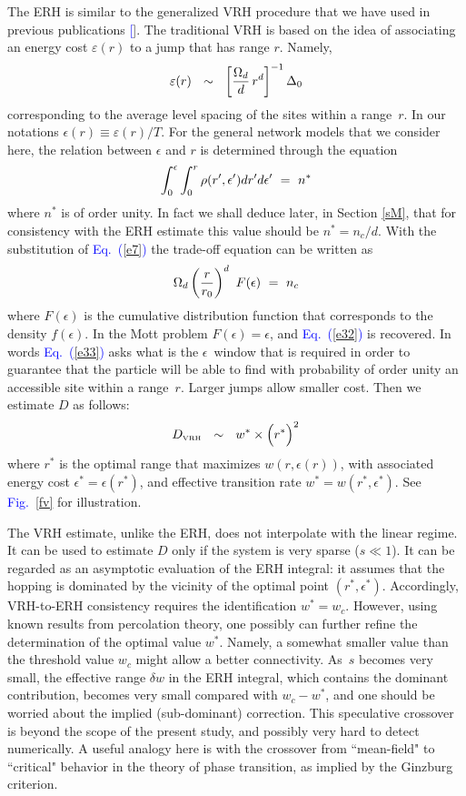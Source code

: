 \documentclass[aps,pre,floats,floatfix,twocolumn]{revtex4}
\newcommand{\tbox}[1]{\mbox{\tiny #1}}
\newcommand{\mylabel}[1]{\label{#1}}
\newcommand{\eeq}{\end{eqnarray}}
\newcommand{\be}[1]{\begin{eqnarray}\ifthenelse{#1=-1}
{\nonumber}{\ifthenelse{#1=0}{}{\mylabel{e#1}}}}
\newcommand{\Eq}[1]{\textcolor{blue}{Eq.\!\!~(\ref{#1})}}
\newcommand{\Fig}[1]{\textcolor{blue}{Fig.}\!\!~\ref{#1}}
\newcommand{\rmrk}[1]{#1}
\renewcommand{\cite}[1]{\textcolor{blue}{[\onlinecite{#1}}]} %
\begin{document}
The ERH is similar to the generalized VRH procedure 
that we have used in previous publications \cite{kbd,kbw}.
The traditional VRH is based on the idea of associating
an energy cost $\varepsilon(r)$ to a jump that has range $r$. Namely,  
%
\be{32}
\varepsilon(r) \ \ \sim \ \ \left[\frac{\Omega_d}{d}\, r^d\right]^{-1} \Delta_0
\eeq
%  
corresponding to the average level spacing 
of the sites within a range~$r$. 
%
In our notations $\epsilon(r) \equiv \varepsilon(r)/T$.  
For the general network models that we consider here,
the relation between $\epsilon$ and $r$ 
is determined through the equation 
%
\be{33}
\int_0^{\epsilon} \int_0^{r} \rho(r',\epsilon')  dr'd\epsilon' \  = \  n^* 
\eeq
%
where $n^*$ is of order unity. In fact we shall deduce later, 
in Section \ref{sM}, that for consistency with the ERH estimate 
this value should be $n^*=n_c/d$. With the substitution 
of \Eq{e7} the trade-off equation can be written as 
%
\be{34}
\Omega_d\left(\frac{r}{r_0}\right)^d \ F(\epsilon) \ = \ n_c
\eeq
%
where $F(\epsilon)$ is the cumulative distribution function 
that corresponds to the density $f(\epsilon)$.
In the Mott problem $F(\epsilon)=\epsilon$, and \Eq{e32} is recovered.
In words \Eq{e33} asks what is the $\epsilon$~window that 
is required in order to guarantee that the particle will be able 
to find with probability of order unity an accessible site within 
a range~$r$. Larger jumps allow smaller cost. 
Then we estimate $D$ as follows: 
%
\be{35}
D_{\tbox{VRH}}  \ \ \sim \ \ 
w^* \times \Big(r^*\Big)^2
\eeq
%
where $r^*$ is the optimal range that maximizes $w(r,\epsilon(r))$, 
with associated energy cost $\epsilon^*=\epsilon(r^*)$, 
and effective transition rate ${w^*= w(r^*,\epsilon^*)}$. 
See \Fig{fv} for illustration. 


The VRH estimate, unlike the ERH, 
does not interpolate with the linear regime. 
It can be used to estimate $D$ 
only if the system is very sparse ($s\ll1$).
It can be regarded as an asymptotic evaluation of 
the ERH integral: it assumes that the hopping is dominated 
by the vicinity of the optimal point ${(r^*,\epsilon^*)}$.
Accordingly, VRH-to-ERH consistency requires the identification ${w^*=w_c}$.  
%
\rmrk{However, using known results from percolation theory,} 
one possibly can further refine the determination 
of the optimal value $w^*$. Namely, a somewhat smaller 
value than the threshold value $w_c$ might allow a better connectivity.    
As~$s$ becomes very small, the effective range $\delta w$ in the ERH integral, 
which contains the dominant contribution, becomes very small compared with $w_c-w^*$, 
and one should be worried about the implied (sub-dominant) correction. 
This speculative crossover is beyond the scope of the present study, 
and possibly very hard to detect numerically. A useful analogy  
here is with the crossover from ``mean-field" to ``critical" behavior 
in the theory of phase transition, as implied by the Ginzburg criterion. 
\end{document}
